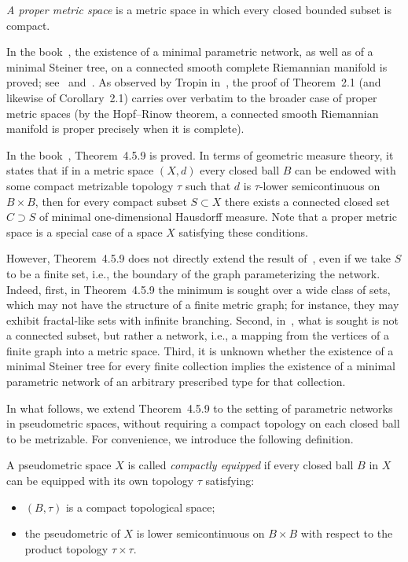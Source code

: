 \documentclass{svproc}
\begin{document}
\begin{definition}
\textit{A proper metric space} is a metric space in which every closed bounded subset is compact.
\end{definition}

In the book~\cite{IT}, the existence of a minimal parametric network, as well as of a minimal Steiner tree, on a connected smooth complete Riemannian manifold is proved; see~\cite[Chapter~2, Paragraph~2, Section~2.1, Theorem~2.1]{IT} and~\cite[Chapter~2, Paragraph~2, Section~2.1, Corollary~2.1]{IT}. As observed by Tropin in~\cite{Tropin}, the proof of Theorem~2.1 (and likewise of Corollary~2.1) carries over verbatim to the broader case of proper metric spaces (by the Hopf--Rinow theorem, a connected smooth Riemannian manifold is proper precisely when it is complete).

In the book~\cite{Ambrosio}, Theorem~4.5.9 is proved. In terms of geometric measure theory, it states that if in a metric space $(X, d)$ every closed ball $B$ can be endowed with some compact metrizable topology $\tau$ such that $d$ is $\tau$-lower semicontinuous on $B\times B$, then for every compact subset $S\subset X$ there exists a connected closed set $C\supset S$ of minimal one-dimensional Hausdorff measure. Note that a proper metric space is a special case of a space $X$ satisfying these conditions.

However, Theorem~4.5.9 does not directly extend the result of~\cite[Theorem~1]{Tropin}, even if we take $S$ to be a finite set, i.e., the boundary of the graph parameterizing the network. Indeed, first, in Theorem~4.5.9 the minimum is sought over a wide class of sets, which may not have the structure of a finite metric graph; for instance, they may exhibit fractal-like sets with infinite branching. Second, in~\cite[Theorem~1]{Tropin}, what is sought is not a connected subset, but rather a network, i.e., a mapping from the vertices of a finite graph into a metric space. Third, it is unknown whether the existence of a minimal Steiner tree for every finite collection implies the existence of a minimal parametric network of an arbitrary prescribed type for that collection.

In what follows, we extend Theorem~4.5.9 to the setting of parametric networks in pseudometric spaces, without requiring a compact topology on each closed ball to be metrizable. For convenience, we introduce the following definition.

\begin{definition}\label{dfn:equipped}
A pseudometric space $X$ is called \textit{compactly equipped} if every closed ball $B$ in $X$ can be equipped with its own topology $\tau$ satisfying$:$
\begin{itemize}
\item $(B, \tau)$ is a compact topological space$;$
\item the pseudometric of $X$ is lower semicontinuous on $B\times B$ with respect to the product topology $\tau\times \tau.$
\end{itemize}
\end{definition}
\end{document}
